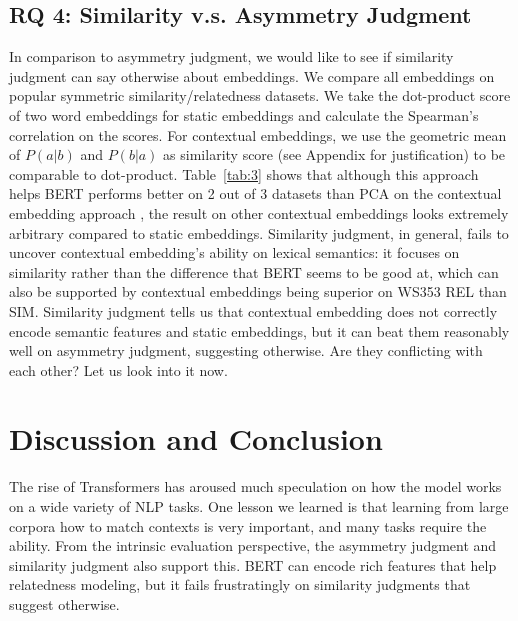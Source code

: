 \documentclass[letterpaper]{article} %
\begin{document}
\subsection{RQ 4: Similarity v.s. Asymmetry Judgment}
In comparison to asymmetry judgment, we would like to see if similarity judgment can say otherwise about embeddings. We compare all embeddings on popular symmetric similarity/relatedness datasets. We take the dot-product score of two word embeddings for static embeddings and calculate the Spearman's correlation on the scores. For contextual embeddings, we use the geometric mean of $P(a|b)$ and $P(b|a)$ as similarity score (see Appendix for justification) to be comparable to dot-product. Table~\ref{tab:3} shows that although this approach helps BERT performs better on 2 out of 3 datasets than PCA on the contextual embedding approach \cite{Ethayarajh2019HowCA}, the result on other contextual embeddings looks extremely arbitrary compared to static embeddings. Similarity judgment, in general, fails to uncover contextual embedding's ability on lexical semantics: it focuses on similarity rather than the difference that BERT seems to be good at, which can also be supported by contextual embeddings being superior on WS353 REL than SIM.
Similarity judgment tells us that contextual embedding does not correctly encode semantic features and static embeddings, but it can beat them reasonably well on asymmetry judgment, suggesting otherwise. Are they conflicting with each other? Let us look into it now.

\section{Discussion and Conclusion}

The rise of Transformers has aroused much speculation on how the model works on a wide variety of NLP tasks. One lesson we learned is that learning from large corpora how to match contexts is very important, and many tasks require the ability. From the intrinsic evaluation perspective, the asymmetry judgment and similarity judgment also support this. BERT can encode rich features that help relatedness modeling, but it fails frustratingly on similarity judgments that suggest otherwise.
\end{document}
